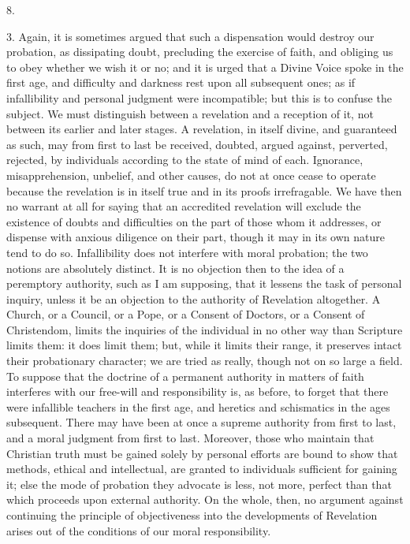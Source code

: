 8.

3. Again, it is sometimes argued that such a
dispensation would destroy our probation, as dissipating
doubt, precluding the exercise of faith, and obliging us
to obey whether we wish it or no; and it is urged that a
Divine Voice spoke in the first age, and difficulty and
darkness rest upon all subsequent ones; as if
infallibility and personal judgment were incompatible;
but this is to confuse the subject. We must distinguish
between a revelation and a reception of it, not between
its earlier and later stages. A revelation, in itself
divine, and guaranteed as such, may from first to last be
received, doubted, argued against, perverted, rejected,
by individuals according to the state of mind of each.
Ignorance, misapprehension, unbelief, and other causes,
do not at once cease to operate because the revelation is
in itself true and in its proofs irrefragable. We have
then no warrant at all for saying that an accredited
revelation will exclude the existence of doubts and
difficulties on the part of those whom it addresses, or
dispense with anxious diligence on their part, though it
may in its own nature tend to do so. Infallibility does
not interfere with moral probation; the two notions are
absolutely distinct. It is no objection then to the idea
of a peremptory authority, such as I am supposing, that
it lessens the task of personal inquiry, unless it be an
objection to the authority of Revelation altogether. A
Church, or a Council, or a Pope, or a Consent of Doctors,
or a Consent of Christendom, limits the inquiries of the
individual in no other way than Scripture limits them: it
does limit them; but, while it limits their range, it
preserves intact their probationary character; we are
tried as really, though not on so large a field. To
suppose that the doctrine of a permanent authority in
matters of faith interferes with our free-will and
responsibility is, as before, to forget that there were
infallible teachers in the first age, and heretics and
schismatics in the ages subsequent. There may have been
at once a supreme authority from first to last, and a
moral judgment from first to last. Moreover, those who
maintain that Christian truth must be gained solely by
personal efforts are bound to show that methods, ethical
and intellectual, are granted to individuals sufficient
for gaining it; else the mode of probation they advocate
is less, not more, perfect than that which proceeds upon
external authority. On the whole, then, no argument
against continuing the principle of objectiveness into
the developments of Revelation arises out of the
conditions of our moral responsibility.

